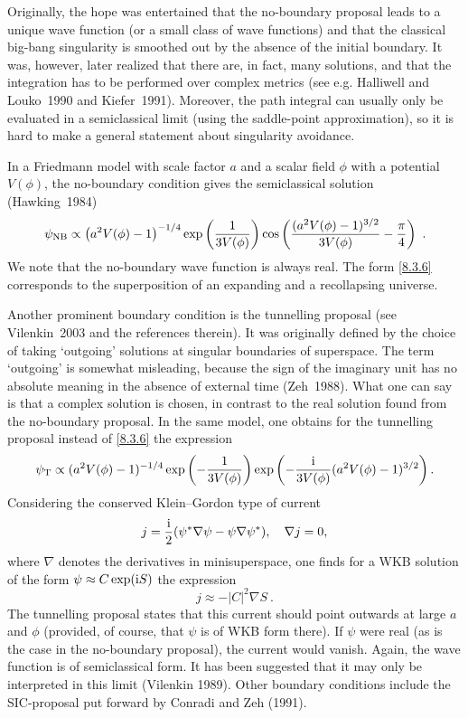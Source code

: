\documentclass[12pt]{article}
\newcommand{\be}{\begin{equation}}
\newcommand{\ee}{\end{equation}}
\newcommand{\lb}{\label}
\newcommand{\I}{{\rm i}}
\begin{document}
Originally, the hope was entertained that the no-boundary proposal
leads to a unique wave function (or a small class of wave functions)
and that the classical big-bang singularity is smoothed out by the
absence of the initial boundary. It was, however, later realized that
there are, in fact, many solutions, and that the integration has to be
performed over complex metrics (see e.g. Halliwell and Louko~1990 and
Kiefer~1991). Moreover, the path integral can usually only be
evaluated in a semiclassical limit (using the saddle-point
approximation), so it is hard to make a general statement about
singularity avoidance. 

In a Friedmann model with scale factor $a$ and a scalar field $\phi$
with a potential $V(\phi)$, the no-boundary condition gives the
semiclassical solution (Hawking~1984) 
\be
\lb{8.3.6}
\psi_{\rm NB}\propto \left(a^2V(\phi)-1\right)^{-1/4}
\exp\left(\frac{1}{3V(\phi)}
\right)\cos\left(\frac{(a^2V(\phi)-1)^{3/2}}{3V(\phi)}-\frac{\pi}{4}\right)\ .
\ee
We note that the no-boundary wave function is always real. The form
\eqref{8.3.6} corresponds to the superposition of an expanding and a
recollapsing universe.

Another prominent boundary condition is the tunnelling proposal
(see Vi\-len\-kin~2003 and the references therein). It was originally
defined by the choice of taking 
`outgoing' solutions at singular boundaries of superspace. The term
`outgoing' is somewhat misleading, because the sign of the imaginary
unit has no absolute meaning in the absence of external time
(Zeh~1988). What one can say is that a complex solution is chosen, in
contrast to the real solution found from the no-boundary proposal. In
the same model, one obtains for the tunnelling proposal instead of
\eqref{8.3.6} the expression 
\be
\lb{8.3.9}
\psi_{\rm T}\propto (a^2V(\phi)-1)^{-1/4}\exp\left(-\frac{1}{3V(\phi)}
\right)\exp\left(-\frac{\I}{3V(\phi)}(a^2V(\phi)-1)^{3/2}\right).
\ee
Considering the conserved Klein--Gordon type of current
\be
\lb{8.3.7}
j=\frac{\I}{2}(\psi^*\nabla\psi-\psi\nabla\psi^*) , \quad \nabla j=0,
\ee
where $\nabla$ denotes the derivatives in minisuperspace, one finds for
a WKB solution of the form $\psi\approx C\exp(\I S)$ the expression
\be
\lb{8.3.8}
j\approx -\vert C\vert^2\nabla S\ .
\ee
The tunnelling proposal states that this current should point outwards
at large $a$ and $\phi$ (provided, of course, that $\psi$ is of WKB form 
there). If $\psi$ were real (as is the case in the no-boundary proposal),
the current would vanish. Again, the wave function is of semiclassical
form. It has been suggested that it may only be interpreted in this
limit (Vilenkin 1989). Other boundary conditions include the
SIC-proposal put forward by Conradi and Zeh (1991).
\end{document}
